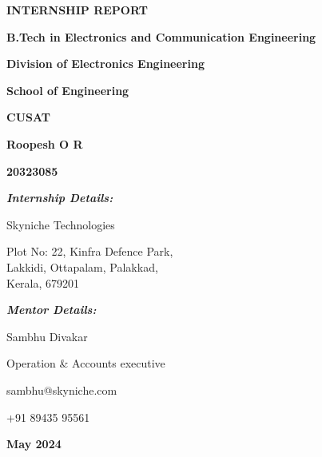 \documentclass[12pt, a4paper]{article}
\begin{document}
\begin{titlepage}
	\centering

	{\huge \textbf{INTERNSHIP REPORT} \par}

	\vspace{1cm}

	{\textbf{B.Tech in Electronics and Communication Engineering} \par}
	{\textbf{Division of Electronics Engineering} \par}
	{\textbf{School of Engineering} \par}
	{\textbf{CUSAT} \par}

	\vspace{1cm}

	\par

	\vspace{1cm}

	{\fontsize{14}{14} \selectfont\textbf{Roopesh O R} \par}
	\vspace{.2cm}
	{\fontsize{14}{14} \selectfont\textbf{20323085} \par}
	\vspace{.6cm}
	{\textbf{\textit{Internship Details:}} \par}
	\vspace{.3cm}
	{Skyniche Technologies \par}
	\vspace{.2cm}
	{

		\parbox{10cm}{
			\fontsize{11}{11}
			\selectfont
			\centering Plot No: 22, Kinfra Defence Park, \\[1pt]Lakkidi, Ottapalam, Palakkad,\\[1pt]Kerala, 679201}
	}

	\vspace{.8cm}

	{\textit{\textbf{Mentor Details:}} \par}
	\vspace{.1cm}
	{Sambhu Divakar \par}
	{Operation \& Accounts executive \par}
	{sambhu@skyniche.com \par}
	{+91 89435 95561 \par}

	\vspace{1.8cm}
	{\textbf{May 2024} \par}
	\vfill

\end{titlepage}
\setlength{\parskip}{5pt}%
\end{document}
